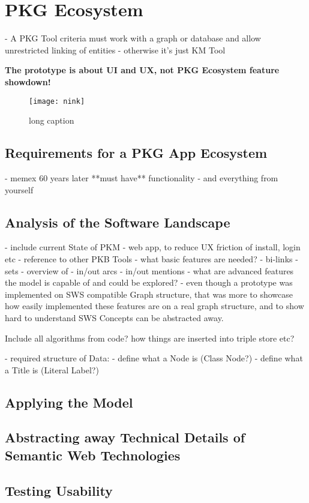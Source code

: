\chapter{PKG Ecosystem}
- A PKG Tool criteria must work with a graph or database and allow unrestricted linking of entities
    - otherwise it’s just KM Tool

\textbf{The prototype is about UI and UX, not PKG Ecosystem feature showdown!}

\begin{figure}
    \centering
    \label{fig:nink}
    \texttt{[image: nink]}
    \caption[short cap]{long caption}
\end{figure}
\section{Requirements for a PKG App Ecosystem}
- memex 60 years later **must have** functionality
- and everything from yourself
\section{Analysis of the Software Landscape}
- include current State of PKM
- web app, to reduce UX friction of install, login etc
- reference to other PKB Tools
- what basic features are needed?
    - bi-links
    - sets
    - overview of
        - in/out arcs
        - in/out mentions
- what are advanced features the model is capable of and could be explored?
- even though a prototype was implemented on SWS compatible Graph structure, that was more to showcase how easily implemented these features are on a real graph structure, and to show hard to understand SWS Concepts can be abstracted away.

Include all algorithms from code? how things are inserted into triple store etc?

- required structure of Data:
    - define what a Node is (Class Node?)
    - define what a Title is (Literal Label?)
\section{Applying the Model}
\section{Abstracting away Technical Details of Semantic Web Technologies}
\section{Testing Usability}


